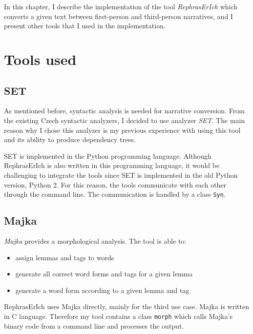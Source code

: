 In this chapter, I describe the implementation of the tool \emph{RephrasErIch} which converts a given text between first-person and third-person narratives, and I present other tools that I used in the implementation.

\section{Tools used}

\subsection{SET}

As mentioned before, syntactic analysis is needed for narrative conversion. From the existing Czech syntactic analyzers, I decided to use analyzer \emph{SET}. The main reason why I chose this analyzer is my previous experience with using this tool and its ability to produce dependency trees.

SET is implemented in the Python programming language. Although RephrasErIch is also written in this programming language, it would be challenging to integrate the tools since SET is implemented in the old Python version, Python 2. For this reason, the tools communicate with each other through the command line. The communication is handled by a class \texttt{Syn}.

\subsection{Majka}

\emph{Majka} \cite{majka} provides a morphological analysis. The tool is able to:
\begin{itemize}
	\item assign lemmas and tags to words
	\item generate all correct word forms and tags for a given lemma
	\item generate a word form according to a given lemma and tag
\end{itemize}

RephrasErIch uses Majka directly, mainly for the third use case. Majka is written in C language. Therefore my tool contains a class \texttt{morph} which calls Majka's binary code from a command line and processes the output.

